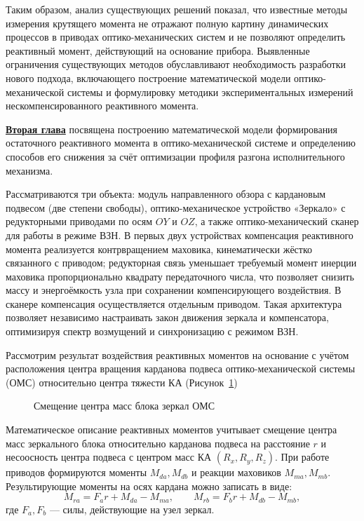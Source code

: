 Таким образом, анализ существующих решений показал, что известные методы измерения крутящего момента не отражают полную картину динамических процессов в приводах оптико-механических систем и не позволяют определить реактивный момент, действующий на основание прибора.
Выявленные ограничения существующих методов обуславливают необходимость разработки нового подхода, включающего построение математической модели оптико-механической системы и формулировку методики экспериментальных измерений нескомпенсированного реактивного момента.


\underline{\textbf{Вторая глава}} посвящена построению математической модели формирования остаточного реактивного момента в оптико-механической системе и определению способов его снижения за счёт оптимизации профиля разгона исполнительного механизма.

Рассматриваются три объекта: модуль направленного обзора с кардановым подвесом (две степени свободы), оптико-механическое устройство «Зеркало» с редукторными приводами по осям $OY$ и $OZ$, а также оптико-механический сканер для работы в режиме ВЗН. В первых двух устройствах компенсация реактивного момента реализуется контрвращением маховика, кинематически жёстко связанного с приводом; редукторная связь уменьшает требуемый момент инерции маховика пропорционально квадрату передаточного числа, что позволяет снизить массу и энергоёмкость узла при сохранении компенсирующего воздействия. В сканере компенсация осуществляется отдельным приводом. Такая архитектура позволяет независимо настраивать закон движения зеркала и компенсатора, оптимизируя спектр возмущений и синхронизацию с режимом ВЗН.

Рассмотрим результат воздействия реактивных моментов на основание с учётом расположения центра вращения карданова подвеса оптико-механической системы (ОМС) относительно центра тяжести КА (Рисунок~\cref{fig:tikz_YPK})
\begin{figure}[h!]
	\legend{}
	\caption[Пример \texttt{tikz} схемы]{Смещение центра масс блока зеркал ОМС}\label{fig:tikz_YPK}
\end{figure}

Математическое описание реактивных моментов учитывает смещение центра масс зеркального блока относительно карданова подвеса на расстояние $r$ и несоосность центра подвеса с центром масс КА $(R_x,R_y,R_z)$. При работе приводов формируются моменты $M_{da}, M_{db}$ и реакции маховиков $M_{ma}, M_{mb}$. Результирующие моменты на осях кардана можно записать в виде:
\begin{equation*}
	M_{ra} = F_a r + M_{da} - M_{ma}, 
	\qquad 
	M_{rb} = F_b r + M_{db} - M_{mb},
\end{equation*}
где $F_a, F_b$ --- силы, действующие на узел зеркал. 

